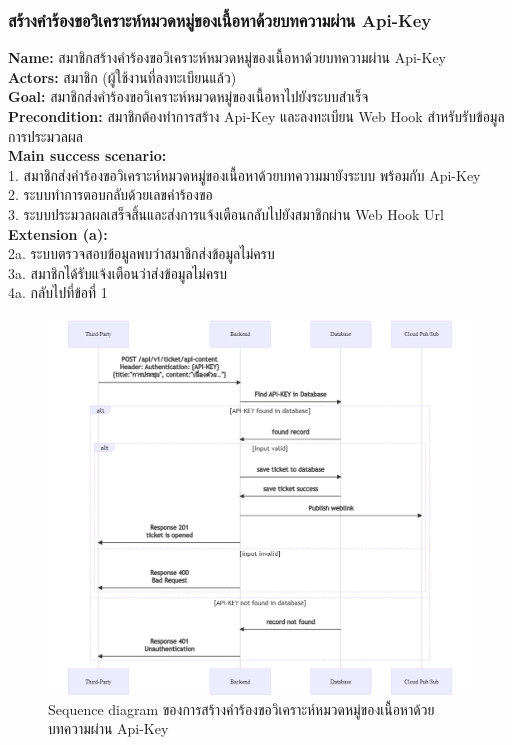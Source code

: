 \documentclass[12pt,oneside,openright,a4paper]{cpe-thai-project}
\begin{document}
\subsubsection{สร้างคำร้องขอวิเคราะห์หมวดหมู่ของเนื้อหาด้วยบทความผ่าน Api-Key}
\textbf{Name: }สมาชิกสร้างคำร้องขอวิเคราะห์หมวดหมู่ของเนื้อหาด้วยบทความผ่าน Api-Key \\
\textbf{Actors: }สมาชิก (ผู้ใช้งานที่ลงทะเบียนแล้ว) \\
\textbf{Goal: }สมาชิกส่งคำร้องขอวิเคราะห์หมวดหมู่ของเนื้อหาไปยังระบบสำเร็จ \\
\textbf{Precondition: }สมาชิกต้องทำการสร้าง Api-Key และลงทะเบียน Web Hook สำหรับรับข้อมูลการประมวลผล \\
\textbf{Main success scenario: } \\
  \hspace*{0.5cm}1. สมาชิกส่งคำร้องขอวิเคราะห์หมวดหมู่ของเนื้อหาด้วยบทความมายังระบบ พร้อมกับ Api-Key \\
  \hspace*{0.5cm}2. ระบบทำการตอบกลับด้วยเลขคำร้องขอ \\
  \hspace*{0.5cm}3. ระบบประมวลผลเสร็จสิ้นและส่งการแจ้งเตือนกลับไปยังสมาชิกผ่าน Web Hook Url  \\
\textbf{Extension (a): } \\
  \hspace*{0.5cm}2a. ระบบตรวจสอบข้อมูลพบว่าสมาชิกส่งข้อมูลไม่ครบ \\
  \hspace*{0.5cm}3a. สมาชิกได้รับแจ้งเตือนว่าส่งข้อมูลไม่ครบ \\
  \hspace*{0.5cm}4a. กลับไปที่ข้อที่ 1 \newpage
\begin{figure}[!ht]\centering
  \includegraphics[width=\textwidth]{./img/seq_contapi.png}
  \caption{Sequence diagram ของการสร้างคำร้องขอวิเคราะห์หมวดหมู่ของเนื้อหาด้วยบทความผ่าน Api-Key}\label{fig:seq_content_api} 
\end{figure}
\end{document}
